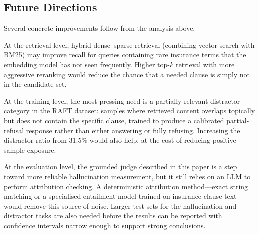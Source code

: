 \subsection{Future Directions}

Several concrete improvements follow from the analysis above.

At the retrieval level, hybrid dense--sparse retrieval (combining vector search
with BM25) may improve recall for queries containing rare insurance terms that
the embedding model has not seen frequently.
Higher top-$k$ retrieval with more aggressive reranking would reduce the
chance that a needed clause is simply not in the candidate set.

At the training level, the most pressing need is a partially-relevant
distractor category in the RAFT dataset: samples where retrieved content
overlaps topically but does not contain the specific clause, trained to produce
a calibrated partial-refusal response rather than either answering or fully
refusing.
Increasing the distractor ratio from 31.5\% would also help, at the cost of
reducing positive-sample exposure.

At the evaluation level, the grounded judge described in this paper is a step
toward more reliable hallucination measurement, but it still relies on an LLM
to perform attribution checking.
A deterministic attribution method---exact string matching or a specialised
entailment model trained on insurance clause text---would remove this source of
noise.
Larger test sets for the hallucination and distractor tasks are also needed
before the results can be reported with confidence intervals narrow enough to
support strong conclusions.
